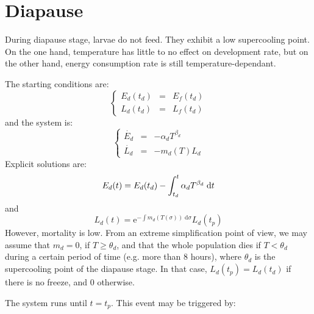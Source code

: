 \documentclass[12 pt]{article}
\begin{document}
\section{Diapause}
During diapause stage, larvae do not feed. They exhibit a low supercooling point. On the one hand, temperature has little to no effect on development rate, but on the other hand, energy consumption rate is still temperature-dependant. \par
The starting conditions are:
\begin{equation}
    \left \lbrace
    \begin{array}{lcl}
        E_d(t_d) & = & E_f(t_d) \\
        L_d(t_d) & = & L_f(t_d)
    \end{array} \right .
\end{equation}
and the system is:
\begin{equation}
    \left \lbrace
    \begin{array}{lcl}
        \Dot{E_d} & = & - \alpha _d T^{\beta _d} \\
        \dot{L_d} & = & - m_d (T) L_d
    \end{array} \right .
\end{equation}
Explicit solutions are:
\begin{equation}
    E_d (t) = E_d (t_d) - \int _{t_d} ^t \alpha _d T^{\beta _d} \; \mathrm{d}t \\
\end{equation}
and
\begin{equation}
    L_d (t) = \mathrm{e}^{- \int m_d(T(\sigma)) \; \mathrm{d}\sigma}L_d (t_p)
\end{equation}
However, mortality is low. From an extreme simplification point of view, we may assume that $m_d = 0$, if $T \geqslant \theta _d$, and that the whole population dies if $T < \theta _d$ during a certain period of time (e.g. more than 8 hours), where $\theta _d$ is the supercooling point of the diapause stage. In that case, $L_d (t_p) = L_d (t_d)$ if there is no freeze, and $0$ otherwise.\par
The system runs until $t=t_p$. This event may be triggered by:
\end{document}
